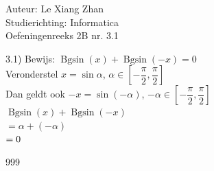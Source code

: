 \documentclass[a4paper]{article}
\newcommand{\bgsin}{\operatorname{Bgsin}}
\begin{document}
\noindent \large Auteur: Le Xiang Zhan \\
\noindent \large Studierichting: Informatica\\
\noindent \large Oefeningenreeks 2B nr. 3.1\\

\medskip

\normalsize
3.1) Bewijs: $\bgsin(x) + \bgsin(-x) = 0$\\


Veronderstel $x = \sin\alpha$, $\alpha \in \left[-\dfrac{\pi}{2}, \dfrac{\pi}{2}\right]$\\

Dan geldt ook $-x = \sin(-\alpha)$, $-\alpha \in \left[-\dfrac{\pi}{2}, \dfrac{\pi}{2}\right]$\\

$\bgsin(x) + \bgsin(-x)$\\

$= \alpha + (-\alpha)$\\

$= 0\\$





\begin{thebibliography}{999}
\end{thebibliography}
\end{document}
